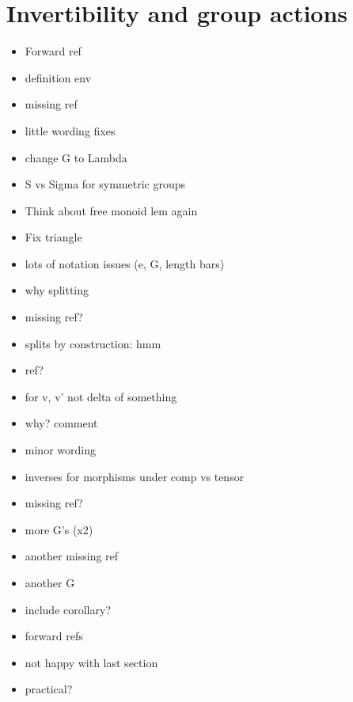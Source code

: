 \documentclass{amsart}
\begin{document}
\section{ Invertibility and group actions}
\begin{itemize}
\item Forward ref
\item definition env
\item missing ref
\item little wording fixes
\item change G to Lambda
\item S vs Sigma for symmetric groups
\item Think about free monoid lem again
\item Fix triangle
\item lots of notation issues (e, G, length bars)
\item why splitting
\item missing ref?
\item splits by construction: hmm
\item ref?
\item for v, v' not delta of something
\item why? comment
\item minor wording
\item inverses for morphisms under comp vs tensor
\item missing ref?
\item more G's (x2)
\item another missing ref
\item another G
\item include corollary?
\item forward refs
\item not happy with last section
\item practical?
\end{itemize}
\end{document}
